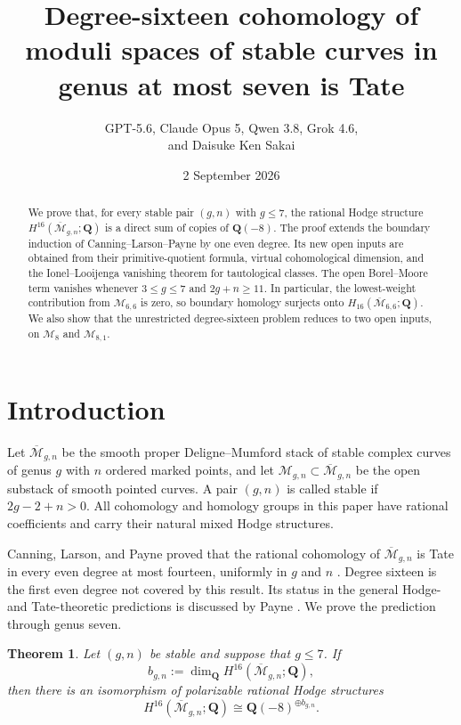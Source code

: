 \documentclass[12pt,reqno]{amsart}
\title[Degree-sixteen cohomology in genus at most seven]
  {Degree-sixteen cohomology of moduli spaces of stable curves in genus at
   most seven is Tate}
\author[GPT-5.6 et al.]
  {GPT-5.6, Claude Opus 5, Qwen 3.8, Grok 4.6,\\
   and Daisuke Ken Sakai}
\date{2 September 2026}
\newcommand{\Q}{\mathbf{Q}}
\newcommand{\M}{\mathcal{M}}
\newcommand{\Mbar}{\overline{\mathcal{M}}}
\newtheorem{theorem}{Theorem}[section]
\theoremstyle{definition}
\theoremstyle{remark}
\begin{document}
\begin{abstract}
We prove that, for every stable pair $(g,n)$ with $g\leq7$, the rational
Hodge structure $H^{16}(\overline{\mathcal M}_{g,n};\Q)$ is a direct sum of
copies of $\Q(-8)$.  The proof extends the boundary induction of
Canning--Larson--Payne by one even degree.  Its new open inputs are obtained
from their primitive-quotient formula, virtual cohomological dimension, and
the Ionel--Looijenga vanishing theorem for tautological classes.  The open Borel--Moore
term vanishes whenever $3\leq g\leq7$ and $2g+n\geq11$.  In particular, the
lowest-weight contribution from $\mathcal M_{6,6}$ is zero, so boundary
homology surjects onto $H_{16}(\overline{\mathcal M}_{6,6};\Q)$.  We also
show that the unrestricted degree-sixteen problem reduces to two open
inputs, on $\mathcal M_{8}$ and $\mathcal M_{8,1}$.
\end{abstract}

\maketitle

\section{Introduction}

Let $\Mbar_{g,n}$ be the smooth proper Deligne--Mumford stack of stable
complex curves of genus $g$ with $n$ ordered marked points, and let
$\M_{g,n}\subset\Mbar_{g,n}$ be the open substack of smooth pointed curves.
A pair $(g,n)$ is called stable if $2g-2+n>0$.  All cohomology and homology
groups in this paper have rational coefficients and carry their natural
mixed Hodge structures.

Canning, Larson, and Payne proved that the rational cohomology of
$\Mbar_{g,n}$ is Tate in every even degree at most fourteen, uniformly in
$g$ and $n$ \cite[Theorem~1.5(3) and the discussion following it]{CLP}.
Degree sixteen is the first even degree not covered by this result.  Its
status in the general Hodge- and Tate-theoretic predictions is discussed by
Payne \cite[Section~4]{PayneSurvey}.  We prove the prediction through genus
seven.

\begin{theorem}\label{thm:main}
Let $(g,n)$ be stable and suppose that $g\leq7$.  If
\[
  b_{g,n}:=\dim_{\Q}H^{16}(\Mbar_{g,n};\Q),
\]
then there is an isomorphism of polarizable rational Hodge structures
\begin{equation}\label{eq:main}
  H^{16}(\Mbar_{g,n};\Q)
  \cong \Q(-8)^{\oplus b_{g,n}}.
\end{equation}
\end{theorem}
\end{document}
